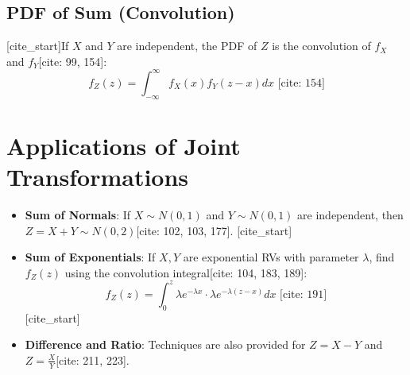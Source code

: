 \documentclass{article}
\begin{document}
\subsection{PDF of Sum (Convolution)}
[cite_start]If $X$ and $Y$ are independent, the PDF of $Z$ is the convolution of $f_X$ and $f_Y$[cite: 99, 154]:
\begin{equation}
    [cite_start]f_Z(z) = \int_{-\infty}^{\infty} f_X(x) f_Y(z-x) dx \text{ [cite: 154]}
\end{equation}

\section{Applications of Joint Transformations}
\begin{itemize}
    [cite_start]\item \textbf{Sum of Normals}: If $X \sim N(0,1)$ and $Y \sim N(0,1)$ are independent, then $Z = X+Y \sim N(0,2)$[cite: 102, 103, 177].
    [cite_start]\item \textbf{Sum of Exponentials}: If $X, Y$ are exponential RVs with parameter $\lambda$, find $f_Z(z)$ using the convolution integral[cite: 104, 183, 189]:
    \begin{equation}
        [cite_start]f_Z(z) = \int_{0}^{z} \lambda e^{-\lambda x} \cdot \lambda e^{-\lambda(z-x)} dx \text{ [cite: 191]}
    \end{equation}
    [cite_start]\item \textbf{Difference and Ratio}: Techniques are also provided for $Z = X - Y$ and $Z = \frac{X}{Y}$[cite: 211, 223].
\end{itemize}
\end{document}

